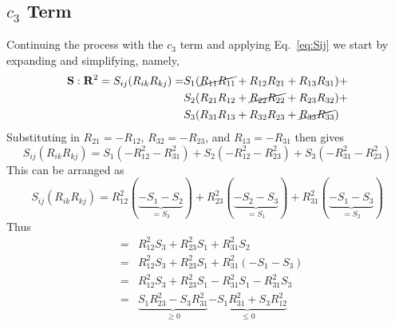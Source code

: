 \subsection{$c_{3}$ Term}
Continuing the process with the $c_{3}$ term and applying Eq.~\ref{eq:Sij}
we start by expanding and simplifying, namely,
\begin{equation}
    \begin{split}
        \mathbf{S}:\mathbf{R}^2 =  S_{ij}(R_{ik}R_{kj}) = &  
                S_{1}(\cancel{R_{11} R_{11}} + R_{12} R_{21} + R_{13} R_{31}) +     \\
            &   S_{2}(R_{21} R_{12} + \cancel{R_{22} R_{22}} + R_{23} R_{32}) +     \\
            &   S_{3}(R_{31} R_{13} + R_{32} R_{23} + \cancel{R_{33} R_{33}})
    \end{split}
\end{equation}
Substituting in $R_{21} = -R_{12}$, $R_{32} = -R_{23}$, and $R_{13} = -
R_{31}$ then gives
\begin{equation}
    S_{ij}(R_{ik}R_{kj}) = 
        S_{1} (-R_{12}^2 - R_{31}^2)  +
        S_{2} (-R_{12}^2 - R_{23}^2)  +
        S_{3} (-R_{31}^2 - R_{23}^2)
\end{equation}
This can be arranged as
\begin{equation}
    S_{ij}(R_{ik}R_{kj}) = 
        R_{12}^{2} (\underbrace{-S_{1} - S_{2}}_{= S_{3}}) + 
        R_{23}^{2} (\underbrace{-S_{2} - S_{3}}_{= S_{1}}) + 
        R_{31}^{2} (\underbrace{-S_{1} - S_{3}}_{= S_{2}})  
\end{equation}
Thus
\begin{subequations}
\begin{eqnarray}
    & = & R_{12}^2 S_{3} + R_{23}^2 S_{1} + R_{31}^2 S_{2}                  \\
    & = & R_{12}^2 S_{3} + R_{23}^2 S_{1} + R_{31}^2 (-S_{1} - S_{3})       \\
    & = & R_{12}^2 S_{3} + R_{23}^2 S_{1} - R_{31}^2 S_{1} - R_{31}^2 S_{3} \\ 
    & = & \underbrace{S_{1} R_{23}^2 - S_{3} R_{31}^{2}}_{\geq 0}          
            \underbrace{-S_{1} R_{31}^2 + S_{3} R_{12}^2}_{\leq 0}
\end{eqnarray}
\end{subequations}

